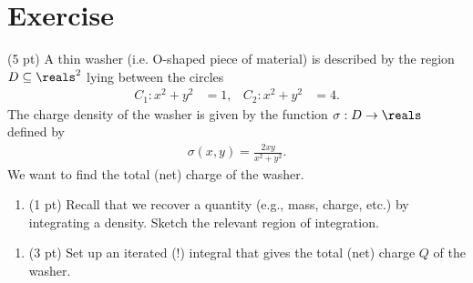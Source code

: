 \section{Exercise}

(5 pt) A thin washer (i.e. O-shaped piece of material) is described by the region $D \subseteq \reals^{2}$ lying between the circles
\begin{align*}
C_{1}:
x^{2} + y^{2}
&=
1,
&
C_{2}:
x^{2} + y^{2}
&=
4.
\end{align*}
The charge density of the washer is given by the function $\sigma: D \rightarrow \reals$ defined by
\begin{align*}
\sigma(x,y)
=
\frac{2 x y}{x^{2} + y^{2}}.
\end{align*}
We want to find the total (net) charge of the washer.
\begin{enumerate}[label=(\alph*)]
\item (1 pt) Recall that we recover a quantity (e.g., mass, charge, etc.) by integrating a density. Sketch the relevant region of integration.
\end{enumerate}




\begin{enumerate}[resume,label=(\alph*)]
\item\label{itm: Set Up Integral} (3 pt) Set up an iterated (!) integral that gives the total (net) charge $Q$ of the washer. 
\end{enumerate}

